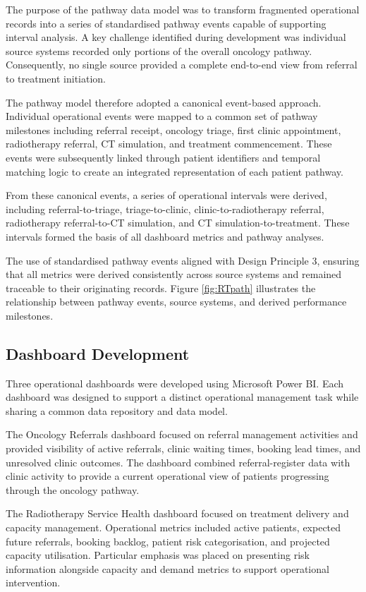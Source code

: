 The purpose of the pathway data model was to transform fragmented operational records into a series of standardised pathway events capable of supporting interval analysis. A key challenge identified during development was individual source systems recorded only portions of the overall oncology pathway. Consequently, no single source provided a complete end-to-end view from referral to treatment initiation. 

The pathway model therefore adopted a canonical event-based approach. Individual operational events were mapped to a common set of pathway milestones including referral receipt, oncology triage, first clinic appointment, radiotherapy referral, CT simulation, and treatment commencement. These events were subsequently linked through patient identifiers and temporal matching logic to create an integrated representation of each patient pathway. 

From these canonical events, a series of operational intervals were derived, including referral-to-triage, triage-to-clinic, clinic-to-radiotherapy referral, radiotherapy referral-to-CT simulation, and CT simulation-to-treatment. These intervals formed the basis of all dashboard metrics and pathway analyses. 

The use of standardised pathway events aligned with Design Principle 3, ensuring that all metrics were derived consistently across source systems and remained traceable to their originating records. Figure \ref{fig:RTpath} illustrates the relationship between pathway events, source systems, and derived performance milestones.

\subsection{Dashboard Development}

Three operational dashboards were developed using Microsoft Power BI. Each dashboard was designed to support a distinct operational management task while sharing a common data repository and data model. 

The Oncology Referrals dashboard focused on referral management activities and provided visibility of active referrals, clinic waiting times, booking lead times, and unresolved clinic outcomes. The dashboard combined referral-register data with clinic activity to provide a current operational view of patients progressing through the oncology pathway. 

The Radiotherapy Service Health dashboard focused on treatment delivery and capacity management. Operational metrics included active patients, expected future referrals, booking backlog, patient risk categorisation, and projected capacity utilisation. Particular emphasis was placed on presenting risk information alongside capacity and demand metrics to support operational intervention. 

